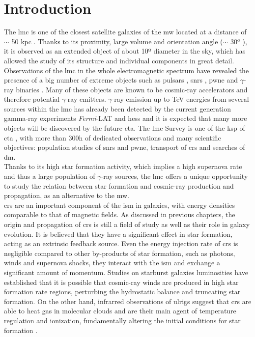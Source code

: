 \documentclass[main.tex]{subfiles}
\begin{document}
\glsresetall

\section{Introduction}

The \gls{lmc} is one of the closest satellite galaxies of the \gls{mw} located at a distance of $\sim$ 50 kpc \cite{2013LMCdistance1}. Thanks to its proximity, large volume and orientation angle ($\sim$ 30º \cite{2004StructureandOrientationLMC}), it is observed as an extended object of about 10º diameter in the sky, which has allowed the study of its structure and individual components in great detail. Observations of the \gls{lmc} in the whole electromagnetic spectrum have revealed the presence of a big number of extreme objects such as pulsars \cite{2013RadioPulsarsLMC} \cite{2016LMCFermiLAT}, \glspl{snr} \cite{2015MultiwavelengthLMCsnr} \cite{2012XMM1987} \cite{2016SNRinXrayLMC},  \gls{pwne} \cite{2015HESSTeVLMC} \cite{2016LMCFermiLAT} \cite{2003PWNeintheLMC} \cite{2008PWNeXrayLMC} and $\gamma$-ray binaries \cite{2017HESSLMCP3}. Many of these objects are known to be cosmic-ray accelerators and therefore potential $\gamma$-ray emitters. $\gamma$-ray emission up to TeV energies from several sources within the \gls{lmc} has already been detected by the current generation gamma-ray experiments \textit{Fermi}-LAT and \gls{hess} and it is expected that many more objects will be discovered by the future \gls{cta}. The \gls{lmc} Survey is one of the \gls{ksp} of \gls{cta} \cite{2019SciencewithCTA}, with more than 300h of dedicated observations and many scientific objectives: population studies of \glspl{snr} and \gls{pwne}, transport of \glspl{cr} and searches of \gls{dm}.\\
Thanks to its high star formation activity, which implies a high supernova rate and thus a large population of $\gamma$-ray sources, the \gls{lmc} offers a unique opportunity to study the relation between star formation and cosmic-ray production and propagation, as an alternative to the \gls{mw}.\\
\glspl{cr} are an important component of the \gls{ism} in galaxies, with energy densities comparable to that of magnetic fields. As discussed in previous chapters, the origin and propagation of \glspl{cr} is still a field of study as well as their role in galaxy evolution. It is believed that they have a significant effect in star formation, acting as an extrinsic feedback source. Even the energy injection rate of \glspl{cr} is negligible compared to other by-products of star formation, such as photons, winds and supernova shocks, they interact with the \gls{ism} and exchange a significant amount of momentum. Studies on starburst galaxies luminosities \cite{2008SocratesCRandSF} have established that it is possible that cosmic-ray winds are produced in high star formation rate regions, perturbing the hydrostatic balance and truncating star formation. On the other hand, infrarred observations of \gls{ulrigs} suggest that \glspl{cr} are able to heat gas in molecular clouds and are their main agent of temperature regulation and ionization, fundamentally altering the initial conditions for star formation \cite{2010PapadopoulosCRinSF}.\\
\end{document}
